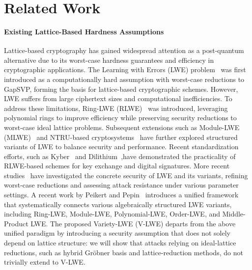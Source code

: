\section{Related Work}
\paragraph{Existing Lattice-Based Hardness Assumptions}  
Lattice-based cryptography has gained widespread attention as a post-quantum alternative due to its worst-case hardness guarantees and efficiency in cryptographic applications. The Learning with Errors (LWE) problem~\cite{oregev_jacm09} was first introduced as a computationally hard assumption with worst-case reductions to GapSVP, forming the basis for lattice-based cryptographic schemes. However, LWE suffers from large ciphertext sizes and computational inefficiencies. To address these limitations, Ring-LWE (RLWE)~\cite{LyubashevskyPR13} was introduced, leveraging polynomial rings to improve efficiency while preserving security reductions to worst-case ideal lattice problems. Subsequent extensions such as Module-LWE (MLWE)~\cite{Albrecht15} and NTRU-based cryptosystems~\cite{Hoffstein1998} have further explored structured variants of LWE to balance security and performance. Recent standardization efforts, such as Kyber~\cite{Bos2018kyber} and Dilithium~\cite{Ducas2018dilithium},have demonstrated the practicality of RLWE-based schemes for key exchange and digital signatures. More recent studies~\cite{May2023,Dottling2023,Pouly2024,Jain2024,Albrecht2023,Bai2023,Chen2023,Ducas2023,Eldar2023} have investigated the concrete security of LWE and its variants, refining worst-case reductions and assessing attack resistance under various parameter settings. A recent work by Peikert and Pepin~\cite{peikert2024} introduces a unified framework that systematically connects various algebraically structured LWE variants, including Ring-LWE, Module-LWE, Polynomial-LWE, Order-LWE, and Middle-Product LWE. The proposed Variety-LWE (V-LWE) departs from the above unified paradigm by introducing a security assumption that does not solely depend on lattice structure: we will show that attacks relying on ideal-lattice reductions, such as hybrid Gröbner basis and lattice-reduction methods, do not trivially extend to V-LWE.

